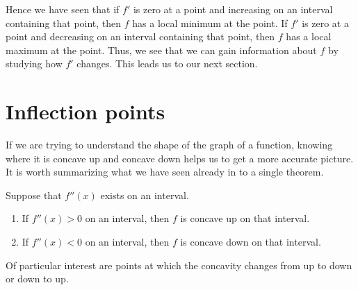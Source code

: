 \documentclass{ximera}
\begin{document}
\begin{example}
\begin{explanation}
\begin{image}
\end{image}
\end{explanation}
\end{example}

Hence we have seen that if $f'$ is zero at a point and increasing on an interval containing that  point,
then $f$ has a local minimum at the point. If $f'$ is zero at a point and
decreasing on an interval containing that point, then $f$ has a local maximum at the
point. Thus, we see that we can gain information about $f$ by
studying how $f'$ changes. This leads us to our next section.

\section{Inflection points}


If we are trying to understand the shape of the graph of a function,
knowing where it is concave up and concave down helps us to get a more
accurate picture.  It is worth summarizing what we have seen already in
to a single theorem.

\begin{theorem}
	Suppose that $f''(x)$ exists on an interval.
	\begin{enumerate}
		\item If $f''(x)>0$ on an interval, then $f$ is concave up on that interval.
		\item If $f''(x)<0$ on an interval, then $f$ is concave down on that interval.
	\end{enumerate}
\end{theorem}


Of particular interest are points at which the concavity changes from
up to down or down to up. 
\end{document}
